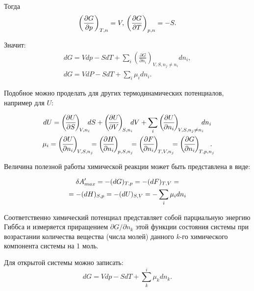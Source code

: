 \documentclass[12pt,a4paper,oneside]{book}
\begin{document}
Тогда
\begin{equation}
	\left( \frac{\partial G}{\partial p} \right)_{T, n} =  V, \\  
	\left( \frac{\partial G}{\partial T} \right)_{p, n} = - S.
\end{equation}

Значит:
\begin{gather}
dG=Vdp-SdT+ \sum_i \left( \frac{\partial G}{\partial n_i} \right)_{V, S, n_j\not=n_i}dn_i, \\  
dG=VdP-SdT+ \sum_i \mu_i dn_i.
\end{gather}

Подобное можно проделать для других термодинамических потенциалов, например для $U$:

\begin{gather}
dU = \left(\! \frac{\partial U}{\partial S} \!\right)_{\!V, n_i}\negthickspace\negthickspace dS+
\left(\! \frac{\partial U}{\partial V} \!\right)_{\!S, n_i} \negthickspace\negthickspace dV +
\sum_i \left(\! \frac{\partial U}{\partial n_i} \!\right)_{\!V, S, n_j\not=n_i} \negthickspace\negthickspace dn_i \\  
\mu_i = \left(\! \frac{\partial U}{\partial n_i} \!\right)_{\!V,S, n_j} \negthickspace\negthickspace=
\left(\! \frac{\partial H}{\partial n_i} \!\right)_{\!p, S, n_j} \negthickspace\negthickspace=
\left(\! \frac{\partial F}{\partial n_i} \!\right)_{\!T, V, n_j} \negthickspace\negthickspace=
\left(\! \frac{\partial G}{\partial n_i} \!\right)_{\!T, p, n_j}\negthickspace\negthickspace\negthickspace.
\end{gather}

Величина полезной работы химической реакции может быть представлена в виде:

\begin{gather}
\delta A_{max}'=-(dG)_{T,p}=-(dF)_{T,V} =\\
= - (dH)_{S,p}=-(dU)_{S,V}=- \sum_i \mu_i dn_i \notag
\end{gather}

Соответственно химический потенциал представляет собой парциальную энергию Гиббса и измеряется приращением $\partial G/ \partial n_k$ этой функции состояния системы при возрастании количества вещества (числа молей) данного $k$-го химического компонента системы на 1 моль.

Для открытой системы можно записать:
\begin{equation}
	dG = Vdp - SdT + \sum_k^i \mu_k dn_k.
\end{equation}
\end{document}
